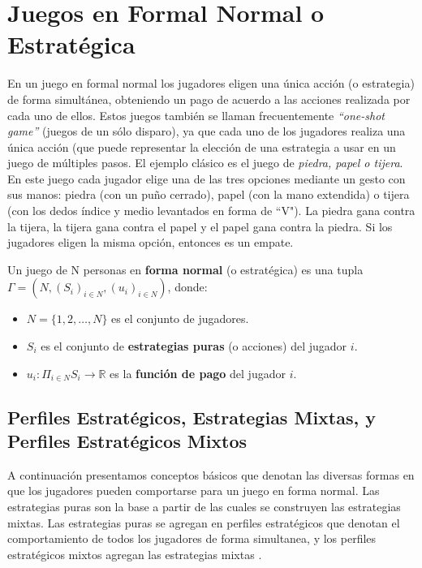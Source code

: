 \chapter{Juegos en Formal Normal o Estratégica}
\label{section:forma-normal}

En un juego en formal normal los jugadores eligen una única acción (o estrategia) de forma simultánea, obteniendo un pago de acuerdo a las acciones realizada por cada uno de ellos. Estos juegos también se llaman frecuentemente \textit{``one-shot game''}   (juegos de un sólo disparo), ya que cada uno de los jugadores realiza una única acción \cite{bib:introductionCFR} (que puede representar la elección de una estrategia a usar en un juego de múltiples pasos. El ejemplo clásico es el juego de \textit{piedra, papel o tijera}. En este juego cada jugador elige una de las tres opciones mediante un gesto con sus manos: piedra (con un puño cerrado), papel (con la mano extendida) o tijera (con los dedos índice y medio levantados en forma de ``V"). La piedra gana contra la tijera, la tijera gana contra el papel y el papel gana contra la piedra. Si los jugadores eligen la misma opción, entonces es un empate.

\begin{definition}
\label{def:forma-normal}
Un juego de N personas en \textbf{forma normal} (o estratégica) es una tupla $\Gamma = (N, (S_i)_{i \in N}, (u_i)_{i \in N})$, donde:
	\begin{itemize}[]
		\item $N = \{1, 2, \dots, N\}$ es el conjunto de jugadores.
		\item  $S_i$ es el conjunto de \textbf{estrategias puras} (o acciones) del jugador $i$.
		\item $u_i : \Pi _{i \in N} S_i \rightarrow \mathbb{R}$ es la \textbf{función de pago} del jugador $i$.
	\end{itemize}
\end{definition}

\section{Perfiles Estratégicos, Estrategias Mixtas, y Perfiles Estratégicos Mixtos}
A continuación presentamos conceptos básicos que denotan las diversas formas en que los jugadores pueden comportarse para un juego en forma normal. Las estrategias puras son la base a partir de las cuales se construyen las estrategias mixtas. Las estrategias puras se agregan en perfiles estratégicos que denotan el comportamiento de todos los jugadores de forma simultanea, y los perfiles estratégicos mixtos agregan las estrategias mixtas \cite{bib:tutorial-existence-nash}.

